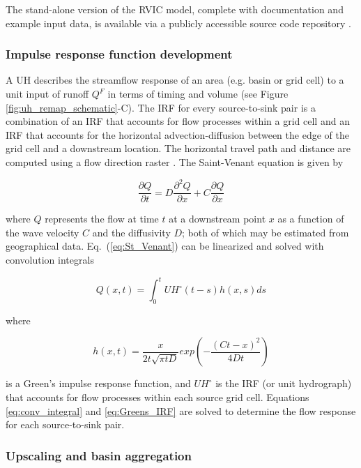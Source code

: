 \documentclass[jgrga, draft]{agutex}
\begin{document}
\begin{article}
The stand-alone version of the RVIC model, complete with documentation and example input data, is available via a publicly accessible source code repository \citep{Hamman_2015}.

\subsubsection{Impulse response function development}
\label{sec:irfs}

A UH describes the streamflow response of an area (e.g. basin or grid cell) to a unit input of runoff $Q^F$ in terms of timing and volume (see Figure \ref{fig:uh_remap_schematic}-C).
The IRF for every source-to-sink pair is a combination of an IRF that accounts for flow processes within a grid cell and an IRF that accounts for the horizontal advection-diffusion between the edge of the grid cell and a downstream location.
The horizontal travel path and distance are computed using a flow direction raster \citep[e.g.][]{Wu_2011}.
The Saint-Venant equation is given by

 \begin{equation}
   \label{eq:St_Venant}
   \frac{\partial Q}{\partial t} = D \frac{\partial^2 Q}{\partial x} + C \frac{\partial Q}{\partial x}
 \end{equation}

where $Q$ represents the flow at time $t$ at a downstream point $x$ as a function of the wave velocity $C$ and the diffusivity $D$; both of which may be estimated from geographical data.
Eq.~(\ref{eq:St_Venant}) can be linearized and solved with convolution integrals

 \begin{equation}
   \label{eq:conv_integral}
	  Q(x,t) = \int_0^t UH^{\circ}(t-s)h(x,s)ds
 \end{equation}

where

 \begin{equation}
   \label{eq:Greens_IRF}
	h(x, t) = \frac{x}{2t\sqrt{\pi tD}}exp\left(-\frac{(Ct-x)^2}{4Dt}\right)
 \end{equation}

is a Green's impulse response function, and $UH^{\circ}$ is the IRF (or unit hydrograph) that accounts for flow processes within each source grid cell.
Equations \ref{eq:conv_integral} and \ref{eq:Greens_IRF} are solved to determine the flow response for each source-to-sink pair.

\subsubsection{Upscaling and basin aggregation}
\label{sec:remap}


\end{article}
\end{document}
